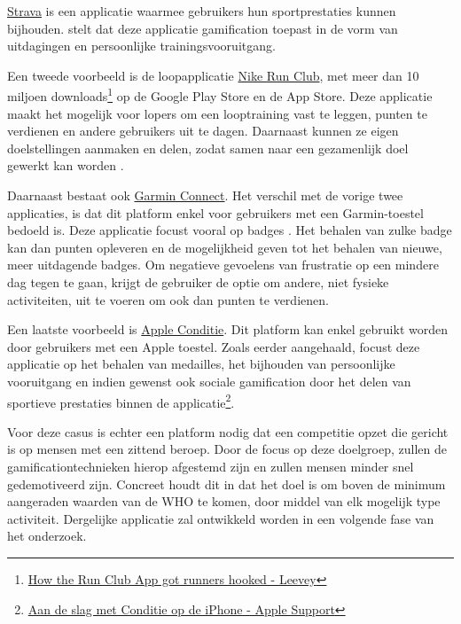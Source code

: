 \href{https://www.strava.com/}{Strava} is een applicatie waarmee gebruikers hun sportprestaties kunnen bijhouden. \textcite{Barratt2017} stelt dat deze applicatie gamification toepast in de vorm van uitdagingen en persoonlijke trainingsvooruitgang.

Een tweede voorbeeld is de loopapplicatie \href{https://www.nike.com/be/en/nrc-app}{Nike Run Club}, met meer dan 10 miljoen downloads\footnote{\href{https://bootcamp.uxdesign.cc/how-the-nike-run-club-app-got-runners-hooked-2850c7654fc5}{How the Run Club App got runners hooked - Leevey}} op de Google Play Store en de App Store. Deze applicatie maakt het mogelijk voor lopers om een looptraining vast te leggen, punten te verdienen en andere gebruikers uit te dagen. Daarnaast kunnen ze eigen doelstellingen aanmaken en delen, zodat samen naar een gezamenlijk doel gewerkt kan worden \autocite{StaalnackeLarsson2013}.

Daarnaast bestaat ook \href{https://connect.garmin.com/}{Garmin Connect}. Het verschil met de vorige twee applicaties, is dat dit platform enkel voor gebruikers met een Garmin-toestel bedoeld is. Deze applicatie focust vooral op badges \autocite{Ilhan2019}. Het behalen van zulke badge kan dan punten opleveren en de mogelijkheid geven tot het behalen van nieuwe, meer uitdagende badges. Om negatieve gevoelens van frustratie op een mindere dag tegen te gaan, krijgt de gebruiker de optie om andere, niet fysieke activiteiten, uit te voeren om ook dan punten te verdienen.

Een laatste voorbeeld is \href{https://support.apple.com/nl-be/guide/iphone/ipha5dddb411/ios}{Apple Conditie}. Dit platform kan enkel gebruikt worden door gebruikers met een Apple toestel. Zoals eerder aangehaald, focust deze applicatie op het behalen van medailles, het bijhouden van persoonlijke vooruitgang en indien gewenst ook sociale gamification door het delen van sportieve prestaties binnen de applicatie\footnote{\href{https://support.apple.com/nl-be/guide/iphone/ipha5dddb411/ios}{Aan de slag met Conditie op de iPhone - Apple Support}}.

Voor deze casus is echter een platform nodig dat een competitie opzet die gericht is op mensen met een zittend beroep. Door de focus op deze doelgroep, zullen de gamificationtechnieken hierop afgestemd zijn en zullen mensen minder snel gedemotiveerd zijn. Concreet houdt dit in dat het doel is om boven de minimum aangeraden waarden van de WHO te komen, door middel van elk mogelijk type activiteit. Dergelijke applicatie zal ontwikkeld worden in een volgende fase van het onderzoek.
